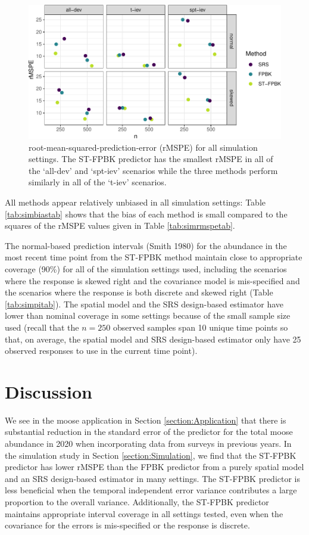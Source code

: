 \documentclass[]{article}    %
\begin{document}
\begin{figure}
\centering
\includegraphics{sim_results.pdf}
\caption{\label{fig:rmspe} root-mean-squared-prediction-error (rMSPE)
for all simulation settings. The ST-FPBK predictor has the smallest
rMSPE in all of the `all-dev' and `spt-iev' scenarios while the three
methods perform similarly in all of the `t-iev' scenarios.}
\end{figure}

All methods appear relatively unbiased in all simulation settings: Table
\ref{tab:simbiastab} shows that the bias of each method is small
compared to the squares of the rMSPE values given in Table
\ref{tab:simrmspetab}.

The normal-based prediction intervals (Smith 1980) for the abundance in
the most recent time point from the ST-FPBK method maintain close to
appropriate coverage (90\%) for all of the simulation settings used,
including the scenarios where the response is skewed right and the
covariance model is mis-specified and the scenarios where the response
is both discrete and skewed right (Table \ref{tab:simpitab}). The
spatial model and the SRS design-based estimator have lower than nominal
coverage in some settings because of the small sample size used (recall
that the \(n = 250\) observed samples span 10 unique time points so
that, on average, the spatial model and SRS design-based estimator only
have 25 observed responses to use in the current time point).

\hypertarget{section:Discussion}{%
\section{Discussion}\label{section:Discussion}}

We see in the moose application in Section \ref{section:Application}
that there is substantial reduction in the standard error of the
predictor for the total moose abundance in 2020 when incorporating data
from surveys in previous years. In the simulation study in Section
\ref{section:Simulation}, we find that the ST-FPBK predictor has lower
rMSPE than the FPBK predictor from a purely spatial model and an SRS
design-based estimator in many settings. The ST-FPBK predictor is less
beneficial when the temporal independent error variance contributes a
large proportion to the overall variance. Additionally, the ST-FPBK
predictor maintains appropriate interval coverage in all settings
tested, even when the covariance for the errors is mis-specified or the
response is discrete.
\end{document}
